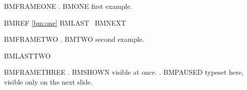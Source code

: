 

\begin{frame}{BMFRAMEONE}
\ex.\label{bm:one} BMONE first example.

BMREF \ref{bm:one} BMLAST \Last\ BMNEXT \Next
\end{frame}

\begin{frame}{BMFRAMETWO}
\ex. BMTWO second example.

BMLASTTWO \Last
\end{frame}

\begin{frame}{BMFRAMETHREE}
\ex. BMSHOWN visible at once.
\pause
\ex. BMPAUSED typeset here, visible only on the next slide.
\end{frame}

